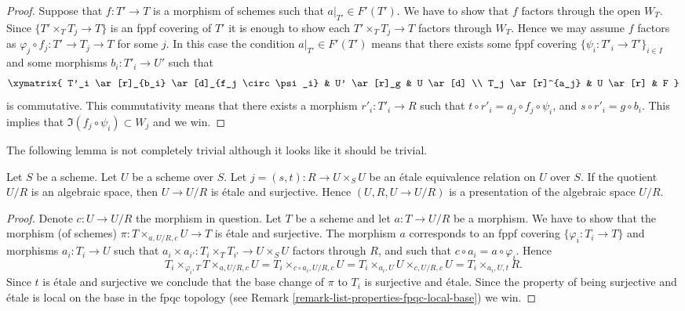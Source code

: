 \begin{proof}
\medskip\noindent
Suppose that $f : T' \to T$ is a morphism of schemes
such that $a|_{T'} \in F'(T')$. We have to show that
$f$ factors through the open $W_T$. Since
$\{T' \times_T T_j \to T\}$ is an fppf covering of $T'$
it is enough to show each $T' \times_T T_j \to T$
factors through $W_T$. Hence we may assume $f$ factors
as $\varphi_j \circ f_j : T' \to T_j \to T$ for some $j$.
In this case the condition $a|_{T'} \in F'(T')$ means that there exists
some fppf covering $\{\psi_i : T'_i \to T'\}_{i \in I}$ and some
morphisms $b_i : T'_i \to U'$ such that
$$
\xymatrix{
T'_i \ar[r]_{b_i} \ar[d]_{f_j \circ \psi_i} & U' \ar[r]_g & U \ar[d] \\
T_j \ar[r]^{a_j} & U \ar[r] & F
}
$$
is commutative. This commutativity means that there exists a
morphism $r'_i : T'_i \to R$ such that
$t \circ r'_i = a_j \circ f_j \circ \psi_i$, and
$s \circ r'_i = g \circ b_i$. This implies that
$\Im(f_j \circ \psi_i) \subset W_j$ and we win.
\end{proof}

\noindent
The following lemma is not completely trivial although it looks
like it should be trivial.

\begin{lemma}
\label{lemma-when-it-works-it-works}
Let $S$ be a scheme. Let $U$ be a scheme over $S$.
Let $j = (s, t) : R \to U \times_S U$
be an \'etale equivalence relation on $U$ over $S$.
If the quotient $U/R$ is an algebraic space, then
$U \to U/R$ is \'etale and surjective. Hence
$(U, R, U \to U/R)$ is a presentation of the algebraic
space $U/R$.
\end{lemma}

\begin{proof}
Denote $c : U \to U/R$ the morphism in question.
Let $T$ be a scheme and let $a : T \to U/R$ be a morphism.
We have to show that the morphism (of schemes)
$\pi : T \times_{a, U/R, c} U \to T$ is \'etale and surjective.
The morphism $a$ corresponds to an fppf covering
$\{\varphi_i : T_i \to T\}$ and morphisms $a_i : T_i \to U$ such
that
$a_i \times a_{i'} : T_i \times_T T_{i'} \to U \times_S U$
factors through $R$, and such that $c \circ a_i = a \circ \varphi_i$.
Hence
$$
T_i \times_{\varphi_i, T} T \times_{a, U/R, c} U =
T_i \times_{c \circ a_i, U/R, c} U =
T_i \times_{a_i, U} U \times_{c, U/R, c} U = T_i \times_{a_i, U, t} R.
$$
Since $t$ is \'etale and surjective we conclude that
the base change of $\pi$ to $T_i$ is surjective and \'etale.
Since the property of being surjective and \'etale is local
on the base in the fpqc topology (see
Remark \ref{remark-list-properties-fpqc-local-base})
we win.
\end{proof}

